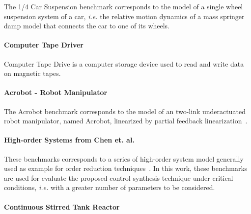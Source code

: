 \documentclass[twocolumn]{autart}    %
\begin{document}
The 1/4 Car Suspension benchmark corresponds to the model of a single 
wheel suspension system of a car, {\it i.e.} the relative motion dynamics 
of a mass springer damp model that connects the car to one of its wheels.

\paragraph*{Computer Tape Driver}

Computer Tape Drive is a computer storage device used to read and write 
data on magnetic tapes.

\paragraph*{Acrobot - Robot Manipulator}

The Acrobot benchmark corresponds to the model of an two-link 
underactuated robot manipulator, named Acrobot, linearized by partial 
feedback linearization~\cite{acrobot}.

\paragraph*{High-order Systems from Chen et. al.}

These benchmarks corresponds to a series of high-order system model 
generally used as example for order reduction techniques~\cite{CHEN1979389}.
 In this work, these benchmarks are used for evaluate the proposed control
 synthesis technique under critical conditions, {\it i.e.} with a greater 
 number of parameters to be considered.


\paragraph*{Continuous Stirred Tank Reactor}
\end{document}

